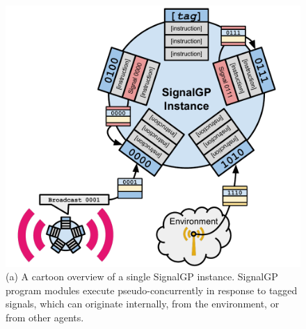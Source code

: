 \begin{figure}
\begin{center}
\begin{minipage}[t]{0.5\linewidth}

\begin{minipage}[t]{\linewidth}
\centering
\vspace{0pt} %
\begin{minipage}{\textwidth}
\includegraphics[width=\linewidth]{img/signalgp-cartoon}
{(a)
A cartoon overview of a single SignalGP instance.
SignalGP program modules execute pseudo-concurrently in response to tagged signals, which can originate internally, from the environment, or from other agents.
}
\end{minipage}
\end{minipage}%


\end{minipage}
\end{center}
\end{figure}
